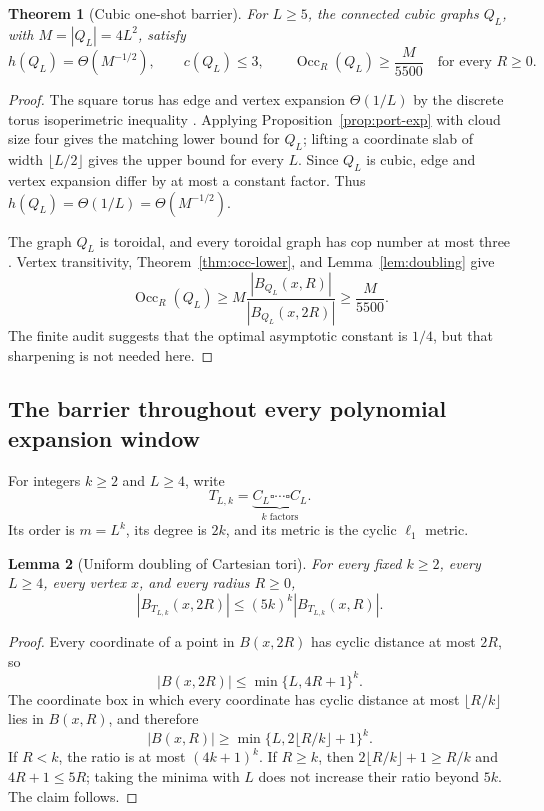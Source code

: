 \documentclass[11pt]{amsart}
\newtheorem{theorem}{Theorem}[section]
\newtheorem{lemma}[theorem]{Lemma}
\theoremstyle{definition}
\newcommand{\cnum}{c}
\newcommand{\Occ}{\operatorname{Occ}}
\begin{document}
\begin{theorem}[Cubic one-shot barrier]\label{thm:cubic-barrier}
For $L\ge5$, the connected cubic graphs $Q_L$, with $M=|Q_L|=4L^2$, satisfy
\[
 \boxed{
 h(Q_L)=\Theta(M^{-1/2}),
 \qquad
 \cnum(Q_L)\le3,
 \qquad
 \Occ_R(Q_L)\ge \frac{M}{5500}
 \quad\text{for every }R\ge0.
 }
\]
\end{theorem}

\begin{proof}
The square torus has edge and vertex expansion $\Theta(1/L)$ by the discrete
torus isoperimetric inequality \cite{BL}.  Applying
Proposition~\ref{prop:port-exp} with cloud size four gives the matching lower
bound for $Q_L$; lifting a coordinate slab of width $\lfloor L/2\rfloor$
gives the upper bound for every $L$.  Since $Q_L$ is cubic, edge and vertex
expansion differ by at most a constant factor.
Thus $h(Q_L)=\Theta(1/L)=\Theta(M^{-1/2})$.

The graph $Q_L$ is toroidal, and every toroidal graph has cop number at most
three \cite{Lehner}.  Vertex transitivity, Theorem~\ref{thm:occ-lower}, and
Lemma~\ref{lem:doubling} give
\[
 \Occ_R(Q_L)
 \ge
 M\frac{|B_{Q_L}(x,R)|}{|B_{Q_L}(x,2R)|}
 \ge \frac{M}{5500}.
\]
The finite audit suggests that the optimal asymptotic constant is $1/4$, but
that sharpening is not needed here.
\end{proof}

\subsection{The barrier throughout every polynomial expansion window}

For integers $k\ge2$ and $L\ge4$, write
\[
 T_{L,k}=\underbrace{C_L\square\cdots\square C_L}_{k\text{ factors}}.
\]
Its order is $m=L^k$, its degree is $2k$, and its metric is the cyclic
$\ell_1$ metric.

\begin{lemma}[Uniform doubling of Cartesian tori]\label{lem:ktorus-doubling}
For every fixed $k\ge2$, every $L\ge4$, every vertex $x$, and every radius
$R\ge0$,
\[
 |B_{T_{L,k}}(x,2R)|\le (5k)^k|B_{T_{L,k}}(x,R)|.
\]
\end{lemma}

\begin{proof}
Every coordinate of a point in $B(x,2R)$ has cyclic distance at most $2R$, so
\[
 |B(x,2R)|\le \min\{L,4R+1\}^k.
\]
The coordinate box in which every coordinate has cyclic distance at most
$\lfloor R/k\rfloor$ lies in $B(x,R)$, and therefore
\[
 |B(x,R)|\ge\min\{L,2\lfloor R/k\rfloor+1\}^k.
\]
If $R<k$, the ratio is at most $(4k+1)^k$.  If $R\ge k$, then
$2\lfloor R/k\rfloor+1\ge R/k$ and $4R+1\le5R$; taking the minima with $L$
does not increase their ratio beyond $5k$.  The claim follows.
\end{proof}
\end{document}
